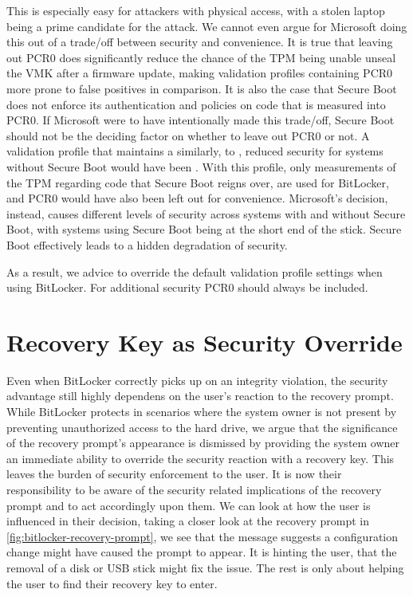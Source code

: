 This is especially easy for attackers with physical access, with a stolen laptop being a prime candidate for the attack.
We cannot even argue for Microsoft doing this out of a trade\-/off between security and convenience.
It is true that leaving out \ac{PCR}0 does significantly reduce the chance of the \ac{TPM} being unable unseal the \ac{VMK} after a firmware update, making validation profiles containing \ac{PCR}0 more prone to false positives in comparison.
It is also the case that Secure Boot does not enforce its authentication and policies on code that is measured into \ac{PCR}0.
If Microsoft were to have intentionally made this trade\-/off, Secure Boot should not be the deciding factor on whether to leave out \ac{PCR}0 or not.
A validation profile that maintains a similarly, to \hyperref[tab:pcr-usage]{}, reduced security for systems without Secure Boot would have been \hyperref[tab:pcr-usage]{}.
With this profile, only measurements of the \ac{TPM} regarding code that Secure Boot reigns over, are used for BitLocker, and \ac{PCR}0 would have also been left out for convenience.
Microsoft's decision, instead, causes different levels of security across systems with and without Secure Boot, with systems using Secure Boot being at the short end of the stick.
Secure Boot effectively leads to a hidden degradation of security.

As a result, we advice to override the default validation profile settings when using BitLocker.
For additional security \ac{PCR}0 should always be included.

\section{Recovery Key as Security Override}

Even when BitLocker correctly picks up on an integrity violation, the security advantage still highly dependens on the user's reaction to the recovery prompt.
While BitLocker protects in scenarios where the system owner is not present by preventing unauthorized access to the hard drive, we argue that the significance of the recovery prompt's appearance is dismissed by providing the system owner an immediate ability to override the security reaction with a recovery key.
This leaves the burden of security enforcement to the user.
It is now their responsibility to be aware of the security related implications of the recovery prompt and to act accordingly upon them.
We can look at how the user is influenced in their decision, taking a closer look at the recovery prompt in \autoref{fig:bitlocker-recovery-prompt}, we see that the message suggests a configuration change might have caused the prompt to appear.
It is hinting the user, that the removal of a disk or \ac{USB} stick might fix the issue.
The rest is only about helping the user to find their recovery key to enter.

